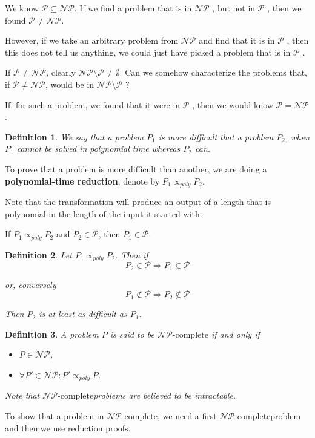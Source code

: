 \documentclass[a4paper,11pt]{report}
\newtheorem*{mydef}{Definition}
\newcommand{\Pc}{\ensuremath{\mathcal{P}} }
\newcommand{\NPc}{\ensuremath{\mathcal{NP}} }
\newcommand{\NPCc}{\ensuremath{\mathcal{NP}\text{-complete}}}
\begin{document}
We know $\Pc \subseteq \NPc$. If we find a problem that is in \NPc, but not in
\Pc, then we found $\Pc \neq \NPc$.

However, if we take an arbitrary problem from \NPc and find that it is in \Pc,
then this does not tell us anything, we could just have picked a problem that is
in \Pc.

If $\Pc \neq \NPc$, clearly $\NPc \setminus \Pc \neq \emptyset$. Can we somehow
characterize the problems that, if $\Pc \neq \NPc$, would be in $\NPc \setminus
\Pc$ ?

If, for such a problem, we found that it were in \Pc, then we would know $\Pc =
\NPc$.

\begin{mydef}
  We say that a problem $P_1$ is more difficult that a problem $P_2$, when $P_1$
  cannot be solved in polynomial time whereas $P_2$ can.
\end{mydef}

To prove that a problem is more difficult than another, we are doing a
\textbf{polynomial-time reduction}, denote by $P_1 \propto_{poly} P_2$.

Note that the transformation will produce an output of a length that is
polynomial in the length of the input it started with.

If $P_1 \propto_{poly} P_2$ and $P_2 \in \Pc$, then $P_1 \in \Pc$.

\begin{mydef}
  Let $P_1 \propto_{poly} P_2$. Then if
  \[
    P_2 \in \Pc \Longrightarrow P_1 \in \Pc
  \]

  or, conversely
  \[
    P_1 \not\in \Pc \Longrightarrow P_2 \not\in \Pc
  \]

  Then $P_2$ is at least as difficult as $P_1$.
\end{mydef}

\begin{mydef}
  A problem $P$ is said to be \textbf{\NPCc} if and only if
  \begin{itemize}
  \item $P \in \NPc$,
  \item $\forall P' \in \NPc : P' \propto_{poly} P$.
  \end{itemize}

  Note that \NPCc problems are believed to be intractable.
\end{mydef}

To show that a problem in \NPCc, we need a first \NPCc problem and then we use
reduction proofs.
\end{document}

